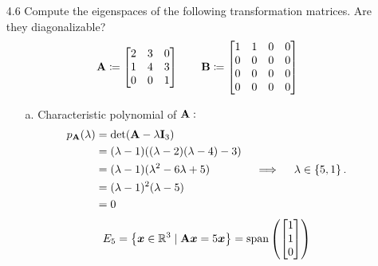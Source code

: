 \documentclass[11pt]{article}
\begin{document}
\begin{enumerate}
    \item[4.6] Compute the eigenspaces of the following transformation matrices.  Are they
          diagonalizable?
          \[
              \mathbf{A} \coloneq
              \begin{bmatrix}
                  2 & 3 & 0 \\
                  1 & 4 & 3 \\
                  0 & 0 & 1 \\
              \end{bmatrix}
              \qquad
              \mathbf{B} \coloneq
              \begin{bmatrix}
                  1 & 1 & 0 & 0 \\
                  0 & 0 & 0 & 0 \\
                  0 & 0 & 0 & 0 \\
                  0 & 0 & 0 & 0 \\
              \end{bmatrix}
          \]
          \begin{enumerate}
              \item[a.] Characteristic polynomial of $\mathbf{A}:$
                    \[
                        \begin{aligned}
                            p_{\mathbf{A}}(\lambda)
                             & = \det(\mathbf{A} - \lambda \mathbf{I}_3)             \\
                             & = (\lambda - 1)((\lambda - 2)(\lambda - 4) - 3) \\
                             & = (\lambda - 1)(\lambda^2 - 6 \lambda + 5)      \\
                             & = (\lambda - 1)^2(\lambda - 5)                  \\
                             & = 0
                        \end{aligned}
                        \quad \implies \quad
                        \lambda \in \left\{5, 1\right\}.
                    \]
                    \[
                        \begin{aligned}
                            E_5 = \set{ \x \in \R^3 \mid \mat{A} \x = 5 \x } = \Span \args{
                                \begin{bmatrix}
                                    1 \\ 1 \\ 0
                                \end{bmatrix}
                            }

\end{aligned}\]
\end{enumerate}
\end{enumerate}
\end{document}
